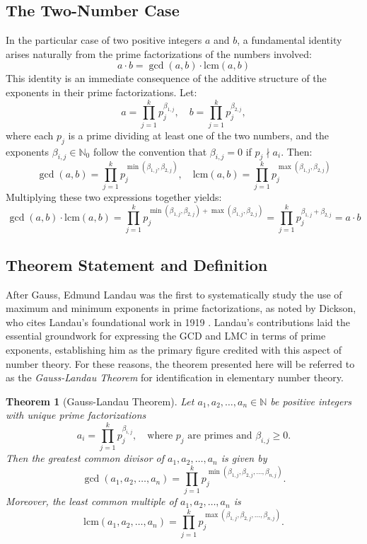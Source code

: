 \documentclass[11pt]{article}
\theoremstyle{plain}
\newtheorem{theorem}{Theorem}
\begin{document}
\subsection{The Two-Number Case}

In the particular case of two positive integers \( a \) and \( b \), a fundamental identity arises naturally from the prime factorizations of the numbers involved:
\[
a \cdot b = \gcd(a, b) \cdot \mathrm{lcm}(a, b)
\]
This identity is an immediate consequence of the additive structure of the exponents in their prime factorizations. Let:
\[
a = \prod_{j=1}^{k} p_j^{\beta_{1,j}}, \quad b = \prod_{j=1}^{k} p_j^{\beta_{2,j}},
\]
where each \( p_j \) is a prime dividing at least one of the two numbers, and the exponents \( \beta_{i,j} \in \mathbb{N}_0 \) follow the convention that \( \beta_{i,j} = 0 \) if \( p_j \nmid a_i \).
Then:
\[
\gcd(a, b) = \prod_{j=1}^{k} p_j^{\min(\beta_{1,j}, \beta_{2,j})}, \quad 
\mathrm{lcm}(a, b) = \prod_{j=1}^{k} p_j^{\max(\beta_{1,j}, \beta_{2,j})}
\]
Multiplying these two expressions together yields:
\[
\gcd(a, b) \cdot \mathrm{lcm}(a, b) = \prod_{j=1}^{k} p_j^{\min(\beta_{1,j}, \beta_{2,j}) + \max(\beta_{1,j}, \beta_{2,j})}
= \prod_{j=1}^{k} p_j^{\beta_{1,j} + \beta_{2,j}} = a \cdot b
\]

\subsection{Theorem Statement and Definition}

After Gauss, Edmund Landau \cite{Landau1903} was the first to systematically study the use of maximum and minimum exponents in prime factorizations, as noted by Dickson, who cites Landau's foundational work in 1919 \cite{Dickson1919}. Landau's contributions laid the essential groundwork for expressing the GCD and LMC in terms of prime exponents, establishing him as the primary figure credited with this aspect of number theory. For these reasons, the theorem presented here will be referred to as the \emph{Gauss-Landau Theorem} for identification in elementary number theory.
\vspace{2mm}
\begin{theorem}[Gauss-Landau Theorem]
    Let \(a_1, a_2, \dots, a_n \in \mathbb{N}\) be positive integers with unique prime factorizations
\[
a_i = \prod_{j=1}^k p_j^{\beta_{i,j}}, \quad \text{where } p_j \text{ are primes and } \beta_{i,j} \geq 0.
\]
Then the greatest common divisor of \(a_1, a_2, \dots, a_n\) is given by
\[
\gcd(a_1, a_2, \dots, a_n) = \prod_{j=1}^k p_j^{\min(\beta_{1,j}, \beta_{2,j}, \dots, \beta_{n,j})}.
\]
Moreover, the least common multiple of \(a_1, a_2, \dots, a_n\) is
\[
\mathrm{lcm}(a_1, a_2, \dots, a_n) = \prod_{j=1}^k p_j^{\max(\beta_{1,j}, \beta_{2,j}, \dots, \beta_{n,j})}.
\]
\end{theorem}
\end{document}
